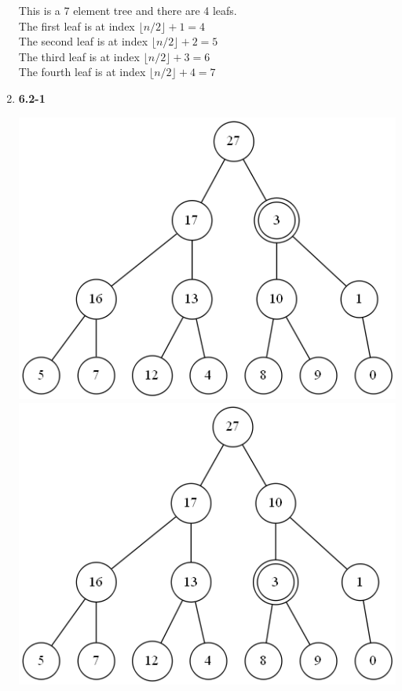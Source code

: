 \documentclass[a4paper]{article}
\begin{document}
\begin{enumerate}
        This is a 7 element tree and there are 4 leafs. \\
        The first leaf is at index $\lfloor n/2 \rfloor + 1 = 4$ \\ 
        The second leaf is at index $\lfloor n/2 \rfloor + 2 = 5$ \\
        The third leaf is at index $\lfloor n/2 \rfloor + 3 = 6$ \\
        The fourth leaf is at index $\lfloor n/2 \rfloor + 4 = 7$

        \newpage
        \item
        \textbf{6.2-1} \\

        \begin{center}
            \includegraphics[scale=0.3]{62-1a} 
            \includegraphics[scale=0.3]{62-1b} 

\end{center}
\end{enumerate}
\end{document}
